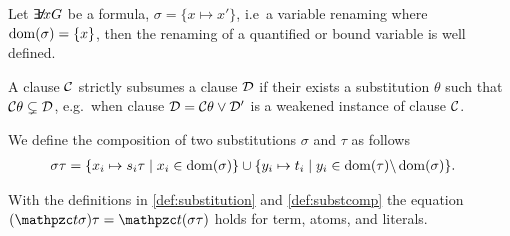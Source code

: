 \begin{definition}
	Let $\quantify x G$ be a formula, $\sigma = \{ x\mapsto x'\}$, i.e~a variable renaming where $\operatorname{dom}(\sigma) = \{ x \}$,
	then the renaming of a quantified or bound variable is well defined.

\end{definition}







\begin{definition}
	A clause $\mathcal{C}$ {\myem strictly subsumes} a clause $\mathcal{D}$ if their exists a substitution $\theta$ such that $\mathcal{C}\theta \subsetneq \mathcal{D}$,
	e.g.~when clause $\mathcal{D} = \mathcal{C}\theta \lor \mathcal{D}'$ is a weakened instance of clause $\mathcal{C}$.
\end{definition}

\begin{definition}\label{def:substcomp}
We define the {\myem composition} of two substitutions $\sigma$ and $\tau$ as follows
	\begin{align*}
		\sigma\tau&=\{ x_i\mapsto s_i\tau\mid x_i\in\operatorname{dom}(\sigma) \}
		\cup
		\{ y_i\mapsto t_i\mid y_i\in\operatorname{dom}(\tau) \backslash \operatorname{dom}(\sigma) \}.
	\end{align*}
\end{definition}

\begin{lemma}\label{lem:substitution}
	With the definitions in \ref{def:substitution} and \ref{def:substcomp} the equation
	$(\mct\sigma)\tau = \mct(\sigma\tau)$ holds for
	term, atoms, and literals.
\end{lemma}

